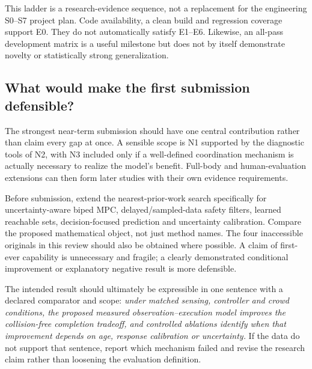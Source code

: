 This ladder is a research-evidence sequence, not a replacement for the engineering
S0--S7 project plan. Code availability, a clean build and regression coverage
support E0. They do not automatically satisfy E1--E6. Likewise, an all-pass
development matrix is a useful milestone but does not by itself demonstrate
novelty or statistically strong generalization.

\subsection{What would make the first submission defensible?}
The strongest near-term submission should have one central contribution rather
than claim every gap at once. A sensible scope is N1 supported by the diagnostic
tools of N2, with N3 included only if a well-defined coordination mechanism is
actually necessary to realize the model's benefit. Full-body and human-evaluation
extensions can then form later studies with their own evidence requirements.

Before submission, extend the nearest-prior-work search specifically for
uncertainty-aware biped MPC, delayed/sampled-data safety filters, learned
reachable sets, decision-focused prediction and uncertainty calibration. Compare
the proposed mathematical object, not just method names. The four inaccessible
originals in this review should also be obtained where possible. A claim of
first-ever capability is unnecessary and fragile; a clearly demonstrated
conditional improvement or explanatory negative result is more defensible.

The intended result should ultimately be expressible in one sentence with a
declared comparator and scope: \emph{under matched sensing, controller and crowd
conditions, the proposed measured observation--execution model improves the
collision-free completion tradeoff, and controlled ablations identify when that
improvement depends on age, response calibration or uncertainty.} If the data do
not support that sentence, report which mechanism failed and revise the research
claim rather than loosening the evaluation definition.
